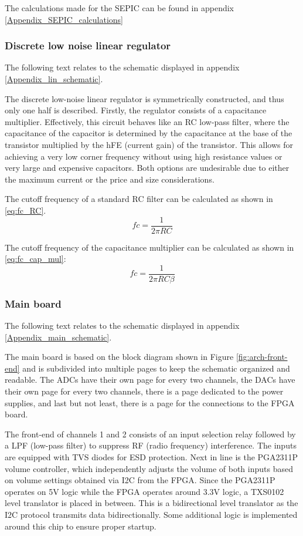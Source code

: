The calculations made for the SEPIC can be found in appendix \ref{Appendix_SEPIC_calculations}

\subsubsection{Discrete low noise linear regulator}
The following text relates to the schematic displayed in appendix \ref{Appendix_lin_schematic}.

The discrete low-noise linear regulator is symmetrically constructed, and thus only one half is described. Firstly, the regulator consists of a capacitance multiplier. Effectively, this circuit behaves like an RC low-pass filter, where the capacitance of the capacitor is determined by the capacitance at the base of the transistor multiplied by the hFE (current gain) of the transistor. This allows for achieving a very low corner frequency without using high resistance values or very large and expensive capacitors. Both options are undesirable due to either the maximum current or the price and size considerations.


The cutoff frequency of a standard RC filter can be calculated as shown in \ref{eq:fc_RC}.
\begin{equation}
    fc=\frac{1}{2 \pi R C}
    \label{eq:fc_RC}
\end{equation}

The cutoff frequency of the capacitance multiplier can be calculated as shown in \ref{eq:fc_cap_mul}:
\begin{equation}
    fc=\frac{1}{2 \pi R C \beta}
    \label{eq:fc_cap_mul}
\end{equation}

\subsubsection{Main board}
The following text relates to the schematic displayed in appendix \ref{Appendix_main_schematic}.

The main board is based on the block diagram shown in Figure \ref{fig:arch-front-end} and is subdivided into multiple pages to keep the schematic organized and readable. The ADCs have their own page for every two channels, the DACs have their own page for every two channels, there is a page dedicated to the power supplies, and last but not least, there is a page for the connections to the FPGA board.

The front-end of channels 1 and 2 consists of an input selection relay followed by a LPF (low-pass filter) to suppress RF (radio frequency) interference. The inputs are equipped with TVS diodes for ESD protection. Next in line is the PGA2311P volume controller, which independently adjusts the volume of both inputs based on volume settings obtained via I2C from the FPGA. Since the PGA2311P operates on 5V logic while the FPGA operates around 3.3V logic, a TXS0102 level translator is placed in between. This is a bidirectional level translator as the I2C protocol transmits data bidirectionally. Some additional logic is implemented around this chip to ensure proper startup.

